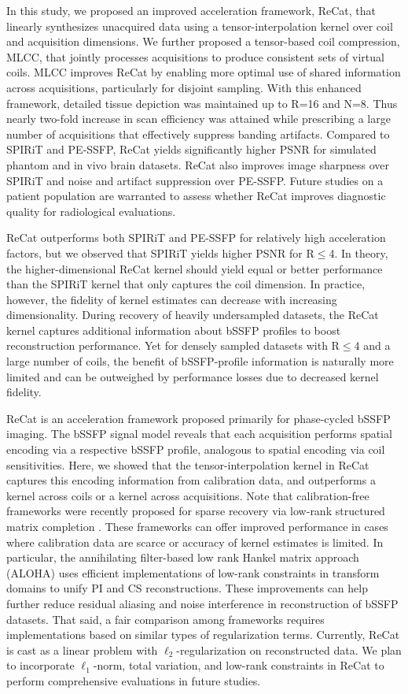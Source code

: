 \documentclass[11pt, onecolumn]{article}
\begin{document}
In this study, we proposed an improved acceleration framework, ReCat, that linearly synthesizes unacquired data using a tensor-interpolation kernel over coil and acquisition dimensions. We further proposed a tensor-based coil compression, MLCC, that jointly processes acquisitions to produce consistent sets of virtual coils. MLCC improves ReCat by enabling more optimal use of shared information across acquisitions, particularly for disjoint sampling. With this enhanced framework, detailed tissue depiction was maintained up to R=16 and N=8. Thus nearly two-fold increase in scan efficiency was attained while prescribing a large number of acquisitions that effectively suppress banding artifacts. Compared to SPIRiT and PE-SSFP, ReCat yields significantly higher PSNR for simulated phantom and in vivo brain datasets. ReCat also improves image sharpness over SPIRiT and noise and artifact suppression over PE-SSFP. Future studies on a patient population are warranted to assess whether ReCat improves diagnostic quality for radiological evaluations. 

ReCat outperforms both SPIRiT and PE-SSFP for relatively high acceleration factors, but we observed that SPIRiT yields higher PSNR for R$\leq$4. In theory, the higher-dimensional ReCat kernel should yield equal or better performance than the SPIRiT kernel that only captures the coil dimension. In practice, however, the fidelity of kernel estimates can decrease with increasing dimensionality. During recovery of heavily undersampled datasets, the ReCat kernel captures additional information about bSSFP profiles to boost reconstruction performance. Yet for densely sampled datasets with R$\leq$4 and a large number of coils, the benefit of bSSFP-profile information is naturally more limited and can be outweighed by performance losses due to decreased kernel fidelity.

ReCat is an acceleration framework proposed primarily for phase-cycled bSSFP imaging. The bSSFP signal model reveals that each acquisition performs spatial encoding via a respective bSSFP profile, analogous to spatial encoding via coil sensitivities. Here, we showed that the tensor-interpolation kernel in ReCat captures this encoding information from calibration data, and outperforms a kernel across coils or a kernel across acquisitions. Note that calibration-free frameworks were recently proposed for sparse recovery via low-rank structured matrix completion \cite{Shin:2013bl, Haldar:2014ei, Jin:2016cz}. These frameworks can offer improved performance in cases where calibration data are scarce or accuracy of kernel estimates is limited. In particular, the annihilating filter-based low rank Hankel matrix approach (ALOHA) uses efficient implementations of low-rank constraints in transform domains to unify PI and CS reconstructions. These improvements can help further reduce residual aliasing and noise interference in reconstruction of bSSFP datasets. That said, a fair comparison among frameworks requires implementations based on similar types of regularization terms. Currently, ReCat is cast as a linear problem with $\ell_2$-regularization on reconstructed data. We plan to incorporate $\ell_1$-norm, total variation, and low-rank constraints in ReCat to perform comprehensive evaluations in future studies. 
\end{document}
